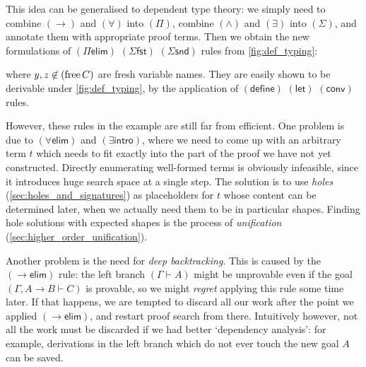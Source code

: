 \documentclass[twoside]{report}
\begin{document}
This idea can be generalised to dependent type theory: we simply need to combine $(\to)$ and $(\forall)$ into $(\Pi)$, combine $(\land)$ and $(\exists)$ into $(\Sigma)$, and annotate them with appropriate proof terms. Then we obtain the new formulations of $(\Pi\mathsf{elim})$ $(\Sigma\mathsf{fst})$ $(\Sigma\mathsf{snd})$ rules from \cref{fig:def_typing}:
\begin{prooftree}
\end{prooftree}
\begin{prooftree}
\end{prooftree}
where $y, z \not\in (\operatorname{free} C)$ are fresh variable names. They are easily shown to be derivable under \cref{fig:def_typing}, by the application of $(\mathsf{define})$ $(\mathsf{let})$ $(\mathsf{conv})$ rules.

However, these rules in the example are still far from efficient. One problem is due to $({\forall}\mathsf{elim})$ and $({\exists}\mathsf{intro})$, where we need to come up with an arbitrary term $t$ which needs to fit exactly into the part of the proof we have not yet constructed. Directly enumerating well-formed terms is obviously infeasible, since it introduces huge search space at a single step. The solution is to use \emph{holes} (\cref{sec:holes_and_signatures}) as placeholders for $t$ whose content can be determined later, when we actually need them to be in particular shapes. Finding hole solutions with expected shapes is the process of \emph{unification} (\cref{sec:higher_order_unification}).

Another problem is the need for \emph{deep backtracking}. This is caused by the $({\to}\mathsf{elim})$ rule: the left branch $(\Gamma \vdash A)$ might be unprovable even if the goal $(\Gamma, A\to B \vdash C)$ is provable, so we might \emph{regret} applying this rule some time later. If that happens, we are tempted to discard all our work after the point we applied $({\to}\mathsf{elim})$, and restart proof search from there. Intuitively however, not all the work must be discarded if we had better `dependency analysis': for example, derivations in the left branch which do not ever touch the new goal $A$ can be saved.
\end{document}
